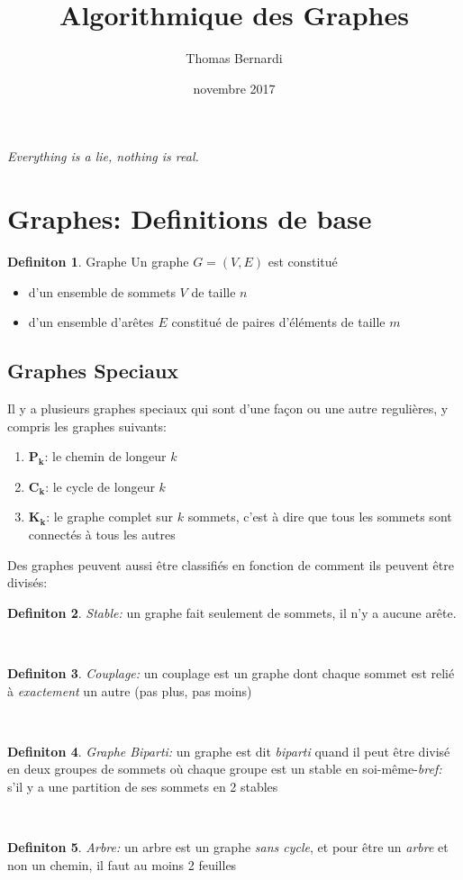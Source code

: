 \documentclass[french]{article}
\title{Algorithmique des Graphes}
\date{novembre 2017}
\author{Thomas Bernardi}
\theoremstyle{definition}
\newtheorem{definition}{Definiton}[subsection]
\begin{document}
	\maketitle
	\begin{center}	
		\textit{Everything is a lie, nothing is real.} \\
	\end{center}

		\tableofcontents
		\newpage
		\section{Graphes: Definitions de base}

		\begin{definition}{Graphe}
			Un graphe $G = (V, E)$ est constitué
			\begin{itemize}
				\item d'un ensemble de sommets $V$ de taille $n$
				\item d'un ensemble d'arêtes $E$ constitué de paires d'éléments de taille $m$
			\end{itemize}
		\end{definition}

		\subsection{Graphes Speciaux}
		Il y a plusieurs graphes speciaux qui sont d'une façon ou une autre regulières, y compris les graphes suivants:
			\begin{enumerate}
				\item $\mathbf{P_k}$: le chemin de longeur $k$
				\item $\mathbf{C_k}$: le cycle de longeur $k$
				\item $\mathbf{K_k}$: le graphe complet sur $k$ sommets, c'est à dire que tous les sommets sont connectés à tous les autres
			\end{enumerate}
			
		Des graphes peuvent aussi être classifiés en fonction de comment ils peuvent être divisés:

		\begin{definition}{\textit{Stable:}}
			un graphe fait seulement de sommets, il n'y a aucune arête.
		\end{definition}
		\
		\begin{definition}{\textit{Couplage:}}
			un couplage est un graphe dont chaque sommet est relié à \textit{exactement} un autre (pas plus, pas moins)
		\end{definition}
		\
		\begin{definition}{\textit{Graphe Biparti:}}
			un graphe est dit \textit{biparti} quand il peut être divisé en deux groupes de sommets où chaque groupe est un stable en soi-même-\textit{bref:} s'il y a une partition de ses sommets en 2 stables
		\end{definition}
		\
		\begin{definition}{\textit{Arbre:}}
			un arbre est un graphe \textit{sans cycle}, et pour être un \textit{arbre} et non un chemin, il faut au moins 2 feuilles
		\end{definition}
\end{document}
